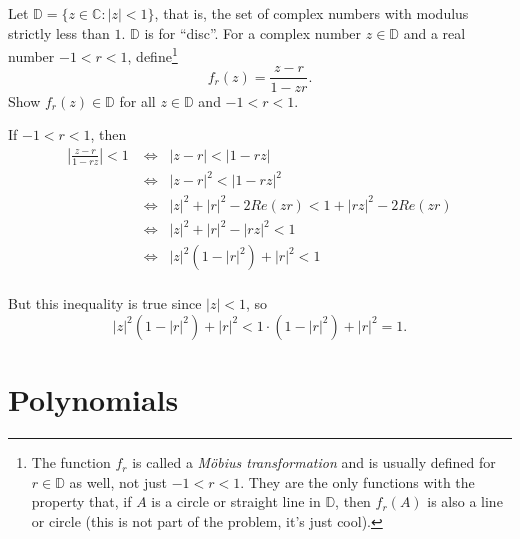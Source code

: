 \documentclass[11pt,dvipsnames]{book}
\numberwithin{figure}{section} %
\numberwithin{table}{section} %
\begin{document}
\begin{exercise} Let $\mathbb{D}=\{z\in \mathbb{C}: |z|<1\}$, that is, the set of complex numbers with modulus strictly less than $1$. \(\mathbb{D}\) is for ``disc''. For a complex number $z\in \mathbb{D}$ and a real number $-1< r<1$, define\footnote{The function $f_{r}$ is called a {\it M\"obius transformation} and is usually defined for $r\in \mathbb{D}$ as well, not just $-1<r<1$. They are the only functions with the property that, if $A$ is a circle or straight line in $\mathbb{D}$, then $f_{r}(A)$ is also a line or circle (this is not part of the problem, it's just cool).}
\[
f_{r}(z) = \frac{z-r}{1-zr}.\]
 Show $f_{r}(z)\in \mathbb{D}$ for all $z\in \mathbb{D}$ and $-1<r<1$.

\begin{solution}
If $-1<r<1$, then
\begin{align*}
\left|\frac{z-r}{1-rz}\right|<1
& \Leftrightarrow \;\;|z-r|<|1-rz|\\
&  \Leftrightarrow \;\; |z-r|^{2}<|1-rz|^{2}\\
& \Leftrightarrow \;\; |z|^{2}+|r|^{2}-2Re(zr)<1+|rz|^{2}-2Re(zr)\\
& \Leftrightarrow \;\; |z|^{2}+|r|^{2}-|rz|^{2}<1\\
& \Leftrightarrow \;\; |z|^{2}(1-|r|^{2})+|r|^{2}<1\\
\end{align*}

But this inequality is true since $|z|<1$, so
\[
|z|^{2}(1-|r|^{2})+|r|^{2}<1\cdot (1-|r|^{2})+|r|^{2}=1.
\]

\end{solution}

\end{exercise}

\chapter{Polynomials}%
\label{polynomials}
%
%
%
%
\end{document}

